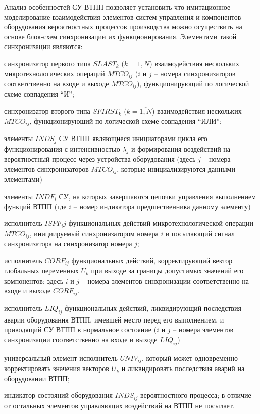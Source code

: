 Анализ особенностей СУ ВТПП позволяет установить что имитационное моделирование взаимодействия элементов систем управления и компонентов оборудования вероятностных процессов производства можно осуществить на основе блок-схем синхронизации их функционирования. Элементами такой синхронизации являются:
\begin{textitemize}
    \item синхронизатор первого типа $SLAST_k$ ($k= \overline{1,N} $) взаимодействия нескольких микротехнологических операций $MTCO_{ij}$ ($i$ и $j$ – номера синхронизаторов соответственно на входе и выходе $MTCO_{ij}$), функционирующий по логической схеме совпадения ``И'';
    \item синхронизатор второго типа $SFIRST_k$ ($k= \overline{1,N} $) взаимодействия нескольких $MTCO_{ij}$, функционирующий по логической схеме совпадения ``ИЛИ'';
    \item элементы $INDS_j$ СУ ВТПП являющиеся инициаторами цикла его функционирования с интенсивностью $\lambda_j$ и формирования воздействий на вероятностный процесс через устройства оборудования (здесь $j$ – номера элементов-синхронизаторов $MTCO_{ij}$, которые инициализируются данными элементами)
    \item элементы $INDF_i$ СУ, на которых завершаются цепочки управления выполнением функций ВТПП (где $i$ – номер индикатора предшественника данному элементу)
    \item исполнитель $ISPF_ij$ функциональных действий микротехнологической операции  $MTCO_{ij}$, инициируемый синхронизатором номера $i$ и посылающий сигнал синхронизатора на синхронизатор номера $j$;
    \item исполнитель $CORF_{ij}$ функциональных действий, корректирующий вектор глобальных переменных $U_k$ при выходе за границы допустимых значений его компонентов; здесь $i$ и $j$ – номера элементов синхронизации соответственно на входе и выходе $CORF_{ij}$.
    \item исполнитель $LIQ_{ij}$ функциональных действий, ликвидирующий последствия аварии оборудования ВТПП, имевшей место перед его выполнением, и приводящий СУ ВТПП в нормальное состояние ($i$ и $j$ – номера элементов синхронизации соответственно на входе и выходе $LIQ_{ij}$)
    \item универсальный элемент-исполнитель $UNIV_{ij}$, который может одновременно корректировать значения векторов $U_k$ и ликвидировать последствия аварий на оборудовании ВТПП;
    \item индикатор состояний оборудования $INDS_{ij}$ вероятностного процесса; в отличие от остальных элементов управляющих воздействий на ВТПП не посылает.
\end{textitemize}


